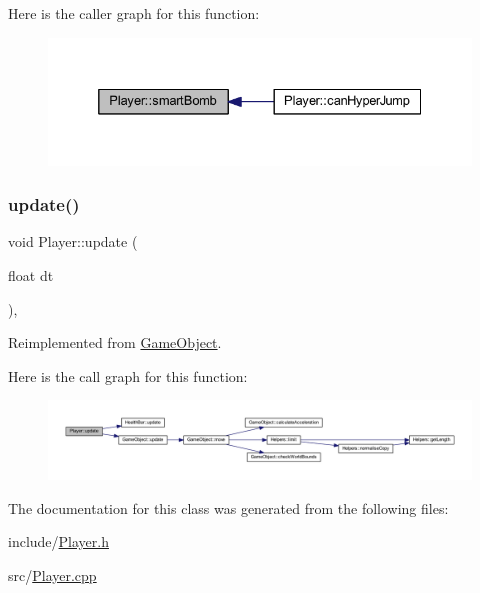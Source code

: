 Here is the caller graph for this function\+:
\nopagebreak
\begin{figure}[H]
\begin{center}
\leavevmode
\includegraphics[width=332pt]{class_player_a3f5229f0a7a2e16f65ea174c46f14567_icgraph}
\end{center}
\end{figure}
\mbox{\label{class_player_abe2902b7decc38472183a08977eeb57f}} 
\subsubsection{\texorpdfstring{update()}{update()}}
{\footnotesize\ttfamily void Player\+::update (\begin{DoxyParamCaption}\item[{float}]{dt }\end{DoxyParamCaption})\hspace{0.3cm}{\ttfamily [override]}, {\ttfamily [virtual]}}



Reimplemented from \hyperlink{class_game_object_a2fece397b6343682d639f8943f124d0e}{Game\+Object}.

Here is the call graph for this function\+:
\nopagebreak
\begin{figure}[H]
\begin{center}
\leavevmode
\includegraphics[width=350pt]{class_player_abe2902b7decc38472183a08977eeb57f_cgraph}
\end{center}
\end{figure}


The documentation for this class was generated from the following files\+:\begin{DoxyCompactItemize}
\item 
include/\hyperlink{_player_8h}{Player.\+h}\item 
src/\hyperlink{_player_8cpp}{Player.\+cpp}\end{DoxyCompactItemize}
